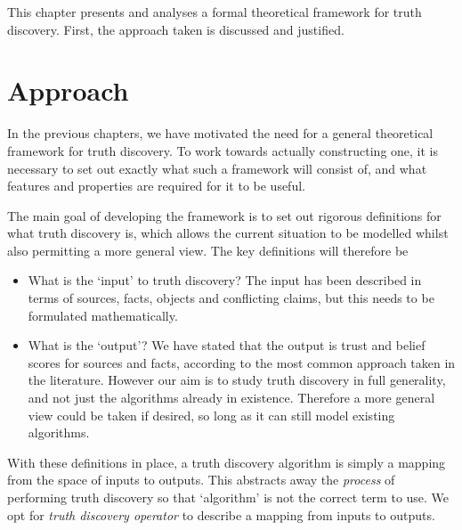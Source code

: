 \documentclass[../main.tex]{subfiles}
\begin{document}
This chapter presents and analyses a formal theoretical framework for truth
discovery. First, the approach taken is discussed and justified.

\section{Approach}
\label{sec:theory_approach}

In the previous chapters, we have motivated the need for a general theoretical
framework for truth discovery. To work towards actually constructing one, it is
necessary to set out exactly what such a framework will consist of, and what
features and properties are required for it to be useful.

The main goal of developing the framework is to set out rigorous definitions
for what truth discovery is, which allows the current situation to be modelled
whilst also permitting a more general view. The key definitions will therefore
be
\begin{itemize}
\item What is the `input' to truth discovery? The input has been described in
terms of sources, facts, objects and conflicting claims, but this needs to be
formulated mathematically.

\item What is the `output'? We have stated that the output is trust and belief
scores for sources and facts, according to the most common approach taken in
the literature. However our aim is to study truth discovery in full generality,
and not just the algorithms already in existence. Therefore a more general view
could be taken if desired, so long as it can still model existing algorithms.

\end{itemize}

With these definitions in place, a truth discovery algorithm is simply a
mapping from the space of inputs to outputs. This abstracts away the
\emph{process} of performing truth discovery so that `algorithm' is not the
correct term to use. We opt for \emph{truth discovery operator} to describe a
mapping from inputs to outputs.
\end{document}

